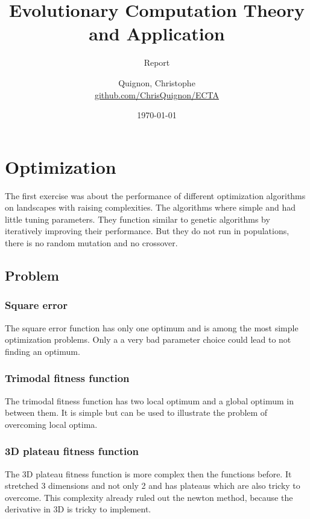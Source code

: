\documentclass{scrartcl}
\begin{document}
\title{Evolutionary Computation Theory and Application}
\subtitle{Report}
\author{
  Quignon, Christophe \\
  \href{https://github.com/ChrisQuignon/ECTA}{github.com/ChrisQuignon/ECTA}
} 
\date{\today}


\maketitle

\newpage

\setcounter{tocdepth}{2}
\setcounter{secnumdepth}{2}
\tableofcontents{}

\newpage

\section{Optimization}
The first exercise was about the performance of different optimization algorithms on landscapes with raising complexities. The algorithms where simple and had little tuning parameters. They function similar to genetic algorithms by iteratively improving their performance. But they do not run in populations, there is no random mutation and no crossover. 

\subsection{Problem}
\subsubsection{Square error}
The square error function has only one optimum and is among the most simple optimization problems. Only a a very bad parameter choice could lead to not finding an optimum.

\subsubsection{Trimodal fitness function}
The trimodal fitness function has two local optimum and a global optimum in between them. It is simple but can be used to illustrate the problem of overcoming local optima.

\subsubsection{3D plateau fitness function}
The 3D plateau fitness function is more complex then the functions before. It stretched 3 dimensions and not only 2 and has plateaus which are also tricky to overcome. This complexity already ruled out the newton method, because the derivative in 3D is tricky to implement.
\end{document}
